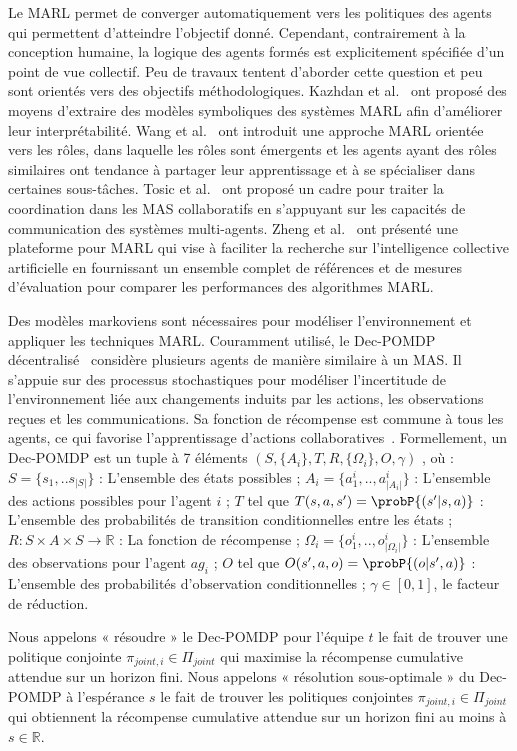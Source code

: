 Le MARL permet de converger automatiquement vers les politiques des agents qui permettent d'atteindre l'objectif donné. Cependant, contrairement à la conception humaine, la logique des agents formés est explicitement spécifiée d'un point de vue collectif. Peu de travaux tentent d'aborder cette question et peu sont orientés vers des objectifs méthodologiques.
Kazhdan et al.~\cite{Kazhdan2020} ont proposé des moyens d'extraire des modèles symboliques des systèmes MARL afin d'améliorer leur interprétabilité.
Wang et al.~\cite{Wang2020} ont introduit une approche MARL orientée vers les rôles, dans laquelle les rôles sont émergents et les agents ayant des rôles similaires ont tendance à partager leur apprentissage et à se spécialiser dans certaines sous-tâches.
Tosic et al.~\cite{Tosic2010} ont proposé un cadre pour traiter la coordination dans les MAS collaboratifs en s'appuyant sur les capacités de communication des systèmes multi-agents.
Zheng et al.~\cite{Zheng2018} ont présenté une plateforme pour MARL qui vise à faciliter la recherche sur l'intelligence collective artificielle en fournissant un ensemble complet de références et de mesures d'évaluation pour comparer les performances des algorithmes MARL.

Des modèles markoviens sont nécessaires pour modéliser l'environnement et appliquer les techniques MARL. Couramment utilisé, le Dec-POMDP décentralisé~\cite{Oliehoek2016} considère plusieurs agents de manière similaire à un MAS. Il s'appuie sur des processus stochastiques pour modéliser l'incertitude de l'environnement liée aux changements induits par les actions, les observations reçues et les communications. Sa fonction de récompense est commune à tous les agents, ce qui favorise l'apprentissage d'actions collaboratives~\cite{Beynier2013}. Formellement, un Dec-POMDP est un tuple à 7 éléments $(S,\{A_i\},T,R,\{\Omega_i\},O,\gamma)$ , où : $S = \{s_1, ..s_{|S|}\}$ : L'ensemble des états possibles ; $A_{i} = \{a_{1}^{i},..,a_{|A_{i}|}^{i}\}$ : L'ensemble des actions possibles pour l'agent $i$ ; $T$ tel que $T(s,a,s') = \probP{(s'|s,a)}$ : L'ensemble des probabilités de transition conditionnelles entre les états ; $R: S \times A \times S \rightarrow \mathbb{R}$ : La fonction de récompense ; $\Omega_{i} = \{o_{1}^{i},..,o_{|\Omega_{i}|}^{i}\}$ : L'ensemble des observations pour l'agent $ag_i$ ; $O$ tel que $O(s',a,o) = \probP{(o|s',a)}$ : L'ensemble des probabilités d'observation conditionnelles ; $\gamma \in [0,1]$, le facteur de réduction.

Nous appelons « résoudre » le Dec-POMDP pour l'équipe $t$ le fait de trouver une politique conjointe $\pi_{joint,i} \in \Pi_{joint}$ qui maximise la récompense cumulative attendue sur un horizon fini.
Nous appelons « résolution sous-optimale » du Dec-POMDP à l'espérance $s$ le fait de trouver les politiques conjointes $\pi_{joint,i} \in \Pi_{joint}$ qui obtiennent la récompense cumulative attendue sur un horizon fini au moins à $s \in \mathbb{R}$.

